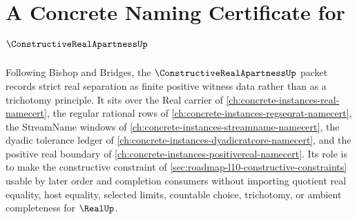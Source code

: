 \chapter{A Concrete Naming Certificate for $\ConstructiveRealApartnessUp$}
\label{ch:concrete-instances-constructive-real-apartness-namecert}

Following Bishop and Bridges, the $\ConstructiveRealApartnessUp$ packet records strict real separation as finite positive witness data rather than as a trichotomy principle. It sits over the Real carrier of \autoref{ch:concrete-instances-real-namecert}, the regular rational rows of \autoref{ch:concrete-instances-regseqrat-namecert}, the StreamName windows of \autoref{ch:concrete-instances-streamname-namecert}, the dyadic tolerance ledger of \autoref{ch:concrete-instances-dyadicratcore-namecert}, and the positive real boundary of \autoref{ch:concrete-instances-positivereal-namecert}. Its role is to make the constructive constraint of \autoref{sec:roadmap-l10-constructive-constraints} usable by later order and completion consumers without importing quotient real equality, host equality, selected limits, countable choice, trichotomy, or ambient completeness for $\RealUp$.

